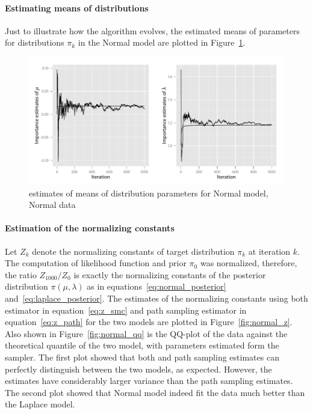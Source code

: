 \paragraph{Estimating means of distributions} Just to illustrate how the
\smc algorithm evolves, the estimated means of parameters for distributions
$\pi_k$ in the Normal model are plotted in
Figure~\ref{fig:normal_dist_mean}.

\begin{figure}[htb]
  \centering
  \includegraphics{fig/5-ndm}
  \caption{\smc estimates of means of distribution parameters for Normal
    model, Normal data}
  \label{fig:normal_dist_mean}
\end{figure}

\paragraph{Estimation of the normalizing constants} Let $Z_k$ denote the
normalizing constants of target distribution $\pi_k$ at iteration $k$. The
computation of likelihood function and prior $\pi_0$ was normalized,
therefore, the ratio $Z_{1000}/Z_0$ is exactly the normalizing constants of
the posterior distribution $\pi(\mu,\lambda)$ as in
equations~\eqref{eq:normal_posterior} and~\eqref{eq:laplace_posterior}. The
estimates of the normalizing constants using both \smc estimator in
equation~\eqref{eq:z_smc} and path sampling estimator in
equation~\eqref{eq:z_path} for the two models are plotted in
Figure~\ref{fig:normal_z}. Also shown in Figure~\ref{fig:normal_qq} is the
QQ-plot of the data against the theoretical quantile of the two model, with
parameters estimated form the \smc sampler. The first plot showed that both
\smc and path sampling estimates can perfectly distinguish between the two
models, as expected. However, the \smc estimates have considerably larger
variance than the path sampling estimates. The second plot showed that
Normal model indeed fit the data much better than the Laplace model.

